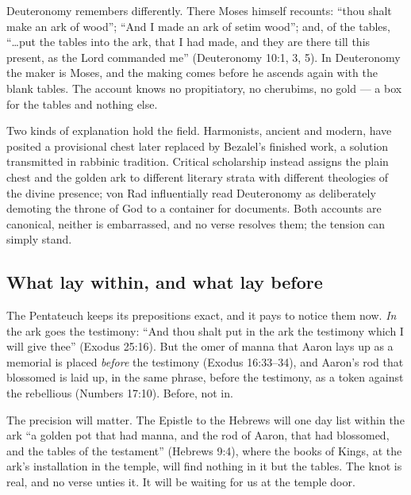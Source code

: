 Deuteronomy remembers differently. There Moses himself recounts: ``thou
shalt make an ark of wood''; ``And I made an ark of setim wood''; and, of
the tables, ``\ldots{}put the tables into the ark, that I had made, and
they are there till this present, as the Lord commanded me'' (Deuteronomy
10:1, 3, 5). In Deuteronomy the maker is
Moses, and the making comes before he ascends again with the blank tables.
The account knows no propitiatory, no cherubims, no gold --- a box for the
tables and nothing else.

Two kinds of explanation hold the field. Harmonists, ancient and modern,
have posited a provisional chest later replaced by Bezalel's finished work,
a solution transmitted in rabbinic tradition. Critical scholarship instead
assigns the plain chest and the golden ark to different literary strata
with different theologies of the divine presence; von Rad influentially
read Deuteronomy as deliberately demoting the throne of God to a container
for documents. Both accounts are canonical,
neither is embarrassed, and no verse resolves them; the tension can simply
stand.

\subsection{What lay within, and what lay before}

The Pentateuch keeps its prepositions exact, and it pays to notice them
now. \emph{In} the ark goes the testimony: ``And thou shalt put in the
ark the testimony which I will give thee'' (Exodus 25:16). But the omer of
manna that Aaron lays up as a memorial is placed \emph{before} the
testimony (Exodus 16:33--34), and Aaron's rod that blossomed is laid up, in
the same phrase, before the testimony, as a token against the rebellious
(Numbers 17:10). Before, not in.

The precision will matter. The Epistle to the Hebrews will one day list
within the ark ``a golden pot that had manna, and the rod of Aaron, that
had blossomed, and the tables of the testament'' (Hebrews 9:4), where the
books of Kings, at the ark's installation in the temple, will find nothing
in it but the tables. The knot is real, and no verse unties it. It
will be waiting for us at the temple door.


